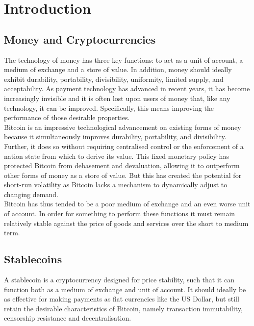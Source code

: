 \section{Introduction}

\subsection{Money and Cryptocurrencies}

\noindent The technology of money has three key functions: to act as a unit of account, a medium of
exchange and a store of value. In addition, money should ideally exhibit durability,
portability, divisibility, uniformity, limited supply, and acceptability.
As payment technology has advanced in recent years, it has become increasingly invisible
and it is often lost upon users of money that, like any technology, it can be improved.
Specifically, this means improving the performance of those desirable properties. \\

\noindent Bitcoin is an impressive technological advancement on existing forms of money because it simultaneously improves durability, portability, and divisibility. Further, it does so without requiring centralised control or the enforcement of a nation state from which to derive its value. This fixed monetary policy has protected Bitcoin from debasement and devaluation, allowing it to outperform other forms of money as a store of value. But this has created the potential for short-run volatility as Bitcoin lacks a mechanism to dynamically adjust to changing demand. \\

\noindent Bitcoin has thus tended to be a poor medium of exchange and an even worse unit of account.
In order for something to perform these functions it must remain
relatively stable against the price of goods and services over the short to medium term.

\subsection{Stablecoins}

\noindent A stablecoin is a cryptocurrency designed for price stability, such that it can function both as a medium of exchange and unit of account. It should ideally be as effective for making payments
as fiat currencies like the US Dollar, but still retain the desirable characteristics of Bitcoin, namely
transaction immutability, censorship resistance and decentralisation. \\

